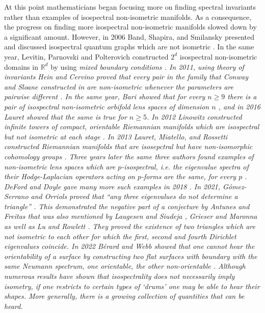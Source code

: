 \documentclass{amsart}
\theoremstyle{definition}
\newcommand*{\R}{\mathbb{R}}
\begin{document}
At this point mathematicians began focusing more on finding spectral invariants rather than examples of isospectral non-isometric manifolds. As a consequence, the progress on finding more isospectral non-isometric manifolds slowed down by a significant amount. However, in 2006 Band, Shapira, and Smilansky presented and discussed isospectral quantum graphs which are not isometric \cite{band2006nodal}.  In the same year, Levitin, Parnovski and Polterovich constructed $2^d$ isospectral non-isometric domains in $\R^d$ by using \em mixed \em boundary conditions \cite{levitin2006}.  In 2011, using theory of invariants Hein and Cervino proved that every pair in the family that Conway and Sloane constructed in \cite{conway1992four} are non-isometric whenever the parameters are pairwise different \cite{cervino2011conway}. In the same year, Bari showed that for every $n \geq 9$ there is a pair of isospectral non-isometric orbifold lens spaces of dimension $n$ \cite{bari2011orbifold}, and in 2016 Lauret showed that the same is true for $n \geq 5$. In 2012 Linowitz constructed infinite towers of compact, orientable Riemannian manifolds which are isospectral but not isometric at each stage \cite{linowitz2012isospectral}. In 2013 Lauret, Miatello, and Rossetti constructed Riemannian manifolds that are isosepctral but have non-isomorphic cohomology groups \cite{lauret2013strongly}. Three years later the same three authors found examples of non-isometric lens spaces which are $p$-isospectral, i.e. the eigenvalue spectra of their Hodge-Laplacian operators acting on $p$-forms are the same, for every $p$ \cite{lauret2016spectra2}. DeFord and Doyle gave many more such examples in 2018 \cite{deford2018cyclic}. In 2021, G\'omez-Serrano and Orriols proved that ``any three eigenvalues do not determine a triangle'' \cite{any_three}.  This demonstrated the negative part of a conjecture by Antunes and Freitas \cite{antunes_freitas} that was also mentioned by Laugesen and Siudeja \cite{laug_siu}, Grieser and Maronna \cite{gm_triangles} as well as Lu and Rowlett \cite{sos}.  They proved the existence of two triangles which are not isometric to each other for which the first, second and fourth Dirichlet eigenvalues coincide.  In 2022 B{\'e}rard and Webb showed that one cannot hear the orientability of a surface by constructing two flat surfaces with boundary with the same Neumann spectrum, one orientable, the other non-orientable \cite{berard2022one}.  Although numerous results have shown that isospectrality does not necessarily imply isometry, if one restricts to certain types of `drums' one may be able to hear their shapes.  More generally, there is a growing collection of quantities that \em can \em be heard. 
\end{document}
